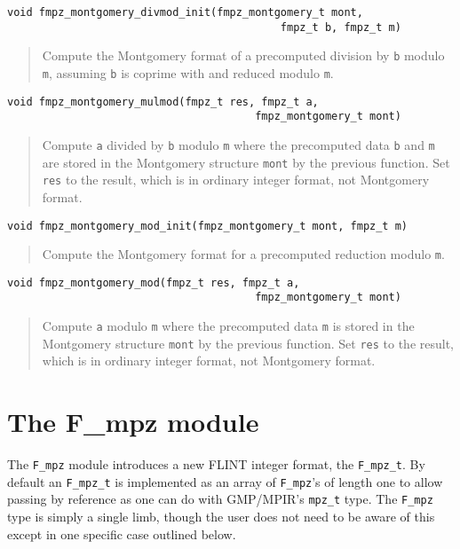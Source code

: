 \documentclass[a4paper,10pt]{article}
\newcommand{\code}{\lstinline}
\begin{document}
\begin{lstlisting}
void fmpz_montgomery_divmod_init(fmpz_montgomery_t mont, 
                                           fmpz_t b, fmpz_t m) 
\end{lstlisting}
\begin{quote}
Compute the Montgomery format of a precomputed division by \code{b} modulo \code{m}, assuming \code{b} is coprime with and reduced modulo \code{m}.
\end{quote}

\begin{lstlisting}
void fmpz_montgomery_mulmod(fmpz_t res, fmpz_t a, 
                                       fmpz_montgomery_t mont)
\end{lstlisting}
\begin{quote}
Compute \code{a} divided by \code{b} modulo \code{m} where the precomputed data \code{b} and \code{m} are stored in the Montgomery structure \code{mont} by the previous function. Set \code{res} to the result, which is in ordinary integer format, not Montgomery format.
\end{quote}

\begin{lstlisting}
void fmpz_montgomery_mod_init(fmpz_montgomery_t mont, fmpz_t m) 
\end{lstlisting}
\begin{quote}
Compute the Montgomery format for a precomputed reduction modulo \code{m}.
\end{quote}

\begin{lstlisting}
void fmpz_montgomery_mod(fmpz_t res, fmpz_t a, 
                                       fmpz_montgomery_t mont)
\end{lstlisting}
\begin{quote}
Compute \code{a} modulo \code{m} where the precomputed data \code{m} is stored in the Montgomery structure \code{mont} by the previous function. Set \code{res} to the result, which is in ordinary integer format, not Montgomery format.
\end{quote}

\section{The F\_mpz module}

The \code{F_mpz} module introduces a new FLINT integer format, the \code{F_mpz_t}. By default an \code{F_mpz_t} is implemented as an array of \code{F_mpz}'s of length one to allow passing by reference as one can do with GMP/MPIR's \code{mpz_t} type. The \code{F_mpz} type is simply a single limb, though the user does not need to be aware of this except in one specific case outlined below.
\end{document}
